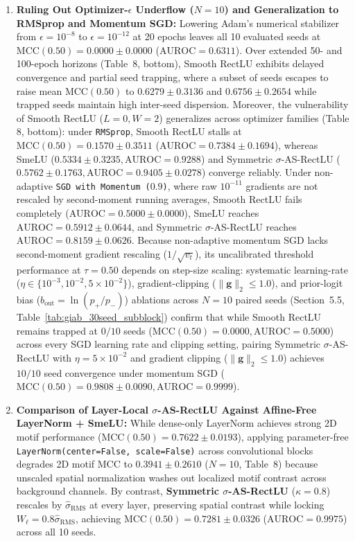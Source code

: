 \documentclass[11pt, a4paper]{article}
\begin{document}
\begin{enumerate}
    \item \textbf{Ruling Out Optimizer-$\epsilon$ Underflow ($N=10$) and Generalization to RMSprop and Momentum SGD:} Lowering Adam's numerical stabilizer from $\epsilon = 10^{-8}$ to $\epsilon = 10^{-12}$ at 20 epochs leaves all 10 evaluated seeds at $\text{MCC}(0.50) = 0.0000 \pm 0.0000$ ($\text{AUROC} = 0.6311$). Over extended 50- and 100-epoch horizons (Table~8, bottom), Smooth RectLU exhibits delayed convergence and partial seed trapping, where a subset of seeds escapes to raise mean $\mathrm{MCC}(0.50)$ to $0.6279 \pm 0.3136$ and $0.6756 \pm 0.2654$ while trapped seeds maintain high inter-seed dispersion. Moreover, the vulnerability of Smooth RectLU ($L=0, W=2$) generalizes across optimizer families (Table 8, bottom): under \texttt{RMSprop}, Smooth RectLU stalls at $\text{MCC}(0.50) = 0.1570 \pm 0.3511$ ($\text{AUROC} = 0.7384 \pm 0.1694$), whereas SmeLU ($0.5334 \pm 0.3235, \text{AUROC} = 0.9288$) and Symmetric $\sigma$-AS-RectLU ($0.5762 \pm 0.1763, \text{AUROC} = 0.9405 \pm 0.0278$) converge reliably. Under non-adaptive \texttt{SGD with Momentum ($0.9$)}, where raw $10^{-11}$ gradients are not rescaled by second-moment running averages, Smooth RectLU fails completely ($\text{AUROC} = 0.5000 \pm 0.0000$), SmeLU reaches $\text{AUROC} = 0.5912 \pm 0.0644$, and Symmetric $\sigma$-AS-RectLU reaches $\text{AUROC} = 0.8159 \pm 0.0626$. Because non-adaptive momentum SGD lacks second-moment gradient rescaling ($1/\sqrt{v_t}$), its uncalibrated threshold performance at $\tau=0.50$ depends on step-size scaling: systematic learning-rate ($\eta \in \{10^{-3}, 10^{-2}, 5\times 10^{-2}\}$), gradient-clipping ($\|\mathbf{g}\|_2 \le 1.0$), and prior-logit bias ($b_{\mathrm{out}} = \ln(p_+/p_-)$) ablations across $N=10$ paired seeds (Section~5.5, Table~\ref{tab:giab_30seed_subblock}) confirm that while Smooth RectLU remains trapped at $0/10$ seeds ($\mathrm{MCC}(0.50) = 0.0000, \mathrm{AUROC} = 0.5000$) across every SGD learning rate and clipping setting, pairing Symmetric $\sigma$-AS-RectLU with $\eta = 5\times 10^{-2}$ and gradient clipping ($\|\mathbf{g}\|_2 \le 1.0$) achieves $10/10$ seed convergence under momentum SGD ($\mathrm{MCC}(0.50) = 0.9808 \pm 0.0090, \mathrm{AUROC} = 0.9999$).
    \item \textbf{Comparison of Layer-Local $\sigma$-AS-RectLU Against Affine-Free LayerNorm + SmeLU:} While dense-only LayerNorm achieves strong 2D motif performance ($\text{MCC}(0.50) = 0.7622 \pm 0.0193$), applying parameter-free \texttt{LayerNorm(center=False, scale=False)} across convolutional blocks degrades 2D motif MCC to $0.3941 \pm 0.2610$ ($N=10$, Table~8) because unscaled spatial normalization washes out localized motif contrast across background channels. By contrast, \textbf{Symmetric $\sigma$-AS-RectLU} ($\kappa=0.8$) rescales by $\hat{\sigma}_{\text{RMS}}$ at every layer, preserving spatial contrast while locking $W_{\ell} = 0.8\hat{\sigma}_{\text{RMS}}$, achieving $\text{MCC}(0.50) = 0.7281 \pm 0.0326$ ($\text{AUROC} = 0.9975$) across all 10 seeds.
\end{enumerate}
\end{document}

